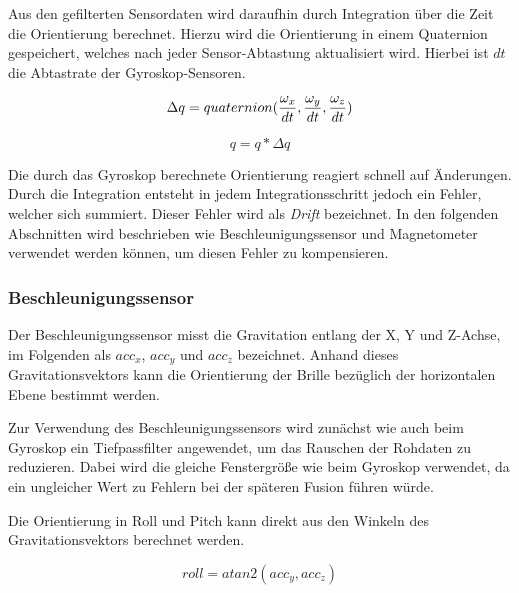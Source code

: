 Aus den gefilterten Sensordaten wird daraufhin durch Integration über
die Zeit die Orientierung berechnet. Hierzu wird die Orientierung in einem Quaternion gespeichert, welches nach jeder Sensor-Abtastung aktualisiert wird. Hierbei ist $dt$ die Abtastrate der Gyroskop-Sensoren.

\begin{equation}
    \Delta q = quaternion({\omega_x \over dt}, {\omega_y \over dt}, {\omega_z \over dt}) \\
\end{equation}

\begin{equation}
    q = q * \Delta q
\end{equation}

Die durch das Gyroskop berechnete Orientierung reagiert schnell auf
Änderungen. Durch die Integration entsteht in jedem Integrationsschritt jedoch ein Fehler, welcher sich summiert. Dieser Fehler wird als \emph{Drift} bezeichnet. In den folgenden Abschnitten wird beschrieben wie Beschleunigungssensor und Magnetometer verwendet werden können, um diesen Fehler zu kompensieren.



\subsubsection{Beschleunigungssensor}

Der Beschleunigungssensor misst die Gravitation entlang der X, Y und Z-Achse, im Folgenden als $acc_x$, $acc_y$ und $acc_z$ bezeichnet. Anhand dieses Gravitationsvektors kann die Orientierung der Brille bezüglich der horizontalen Ebene bestimmt werden.

Zur Verwendung des Beschleunigungssensors wird zunächst wie auch beim
Gyroskop ein Tiefpassfilter angewendet, um das Rauschen der Rohdaten zu
reduzieren. Dabei wird die gleiche Fenstergröße wie beim Gyroskop
verwendet, da ein ungleicher Wert zu Fehlern bei der späteren Fusion
führen würde. 


Die Orientierung in Roll und Pitch kann direkt aus den Winkeln des Gravitationsvektors berechnet werden.

\begin{equation}
    roll = atan2(acc_y, acc_z)
\end{equation}

